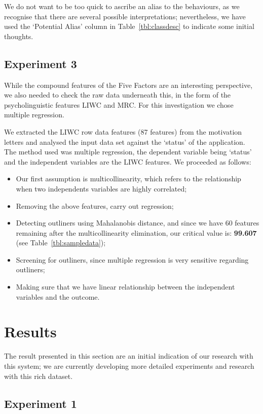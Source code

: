 \documentclass[letterpaper]{article}
\begin{document}
We do not want to be too quick to ascribe an alias to the behaviours,
as we recognise that there are several possible interpretations;
nevertheless, we have used the `Potential Alias' column in
Table~\ref{tbl:classdesc} to indicate some initial thoughts.


\subsection{Experiment 3}

While the compound features of the Five Factors are an interesting
perspective, we also needed to check the raw data underneath this, in
the form of the psycholinguistic features LIWC and MRC. For this
investigation we chose multiple regression.

We extracted the LIWC row data features (87 features) from the
motivation letters and analysed the input data set against the
`status' of the application. The method used was multiple regression,
the dependent variable being `status' and the independent variables
are the LIWC features. We proceeded as follows:

\begin{itemize}
\item Our first assumption is multicollinearity, which refers to the
  relationship when two independents variables are highly correlated;
\item Removing the above features, carry out regression;
\item Detecting outliners using Mahalanobis distance, and since we
  have 60 features remaining after the multicollinearity elimination,
  our critical value is: {\textbf{99.607}} (see Table~\ref{tbl:sampledata});
\item Screening for outliners, since multiple regression is very
  sensitive regarding outliners;
\item Making sure that we have linear relationship between the
  independent variables and the outcome.
\end{itemize}


\section{Results}

The result presented in this section are an initial indication of our
research with this system; we are currently developing more detailed
experiments and research with this rich dataset.

\subsection{Experiment 1}
\end{document}
